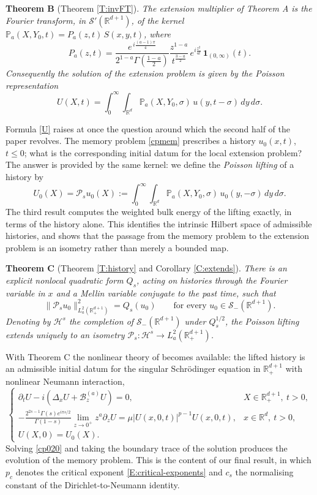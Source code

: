 \documentclass[11pt,letter]{amsart}
\def \RNu {\mathbb{R}^{d+1}}
\def \RN {\mathbb{R}_+^{d+1}}
\def \G{\Gamma}
\newcommand{\Ba}{\mathscr B_z^{(a)}}
\newcommand{\Rd}{\mathbb R^d}
\numberwithin{equation}{section}
\newcommand{\Sm}{\mathscr S_-(\RNu)}
\numberwithin{equation}{section}
\begin{document}
\medskip
\noindent\textbf{Theorem B} (Theorem \ref{T:invFT}).
\emph{The extension multiplier of Theorem A is the Fourier transform, in
$\mathscr S'(\RNu)$, of the kernel
$\mathbb P_a(X,Y_0,t)=P_a(z,t)\,S(x,y,t)$, where
\[
P_a(z,t)
=\frac{e^{\,i\frac{(a-1)\pi}{4}}}{2^{1-a}\G\!\left(\frac{1-a}{2}\right)}
\frac{z^{1-a}}{t^{\frac{3-a}{2}}}\,e^{i\frac{z^2}{4t}}\,\mathbf 1_{(0,\infty)}(t) .
\]
Consequently the solution of the extension problem is given by the Poisson
representation
\begin{equation}\label{U}
U(X,t)=\int_0^\infty\int_{\Rd}\mathbb P_a(X,Y_0,\sigma)\,u(y,t-\sigma)\,dy\,d\sigma .
\end{equation}}

\medskip
Formula \eqref{U} raises at once the question around which the second half of
the paper revolves. The memory problem \eqref{cpmem} prescribes a history $u_0(x,t)$,
$t\le0$; what is the corresponding initial datum for the local extension
problem? The answer is provided by the same kernel: we define the
\emph{Poisson lifting} of a history by
\begin{equation}\label{lift}
U_0(X)=\mathcal P_su_0(X)
:=\int_0^\infty\int_{\Rd}\mathbb P_a(X,Y_0,\sigma)\,u_0(y,-\sigma)\,dy\,d\sigma .
\end{equation}
The third result computes the weighted bulk energy of the lifting exactly, in
terms of the history alone. This identifies the intrinsic Hilbert space of
admissible histories, and shows that the passage from the memory problem to the
extension problem is an isometry rather than merely a bounded map.

\medskip
\noindent\textbf{Theorem C} (Theorem \ref{T:history} and Corollary \ref{C:extends}).
\emph{There is an explicit nonlocal quadratic form $Q_s$, acting on histories
through the Fourier variable in $x$ and a Mellin variable conjugate to the past
time, such that
\[
\|\mathcal P_su_0\|^2_{L^2_a(\RN)}=Q_s(u_0)
\qquad\text{for every } u_0\in\Sm .
\]
Denoting by $\mathcal H^s$ the completion of $\Sm$ under $Q_s^{1/2}$, the
Poisson lifting extends uniquely to an isometry
$\mathcal P_s:\mathcal H^s\to L^2_a(\RN)$.}

\medskip
With Theorem C the nonlinear theory of \cite{GS2} becomes available: the lifted
history is an admissible initial datum for the singular Schr\"odinger equation
in $\RN$ with nonlinear Neumann interaction,
\begin{equation}\label{cp020}
\begin{cases}
\partial_tU-i(\Delta_xU+\Ba U)=0,
&X\in\RN,\ t>0,
\\
\displaystyle
-\frac{2^{2s-1}\G(s)e^{i\pi s/2}}{\G(1-s)}\lim_{z\to0^+}z^a\partial_zU
=\mu |U(x,0,t)|^{p-1}U(x,0,t),
&x\in\Rd,\ t>0,
\\
U(X,0)=U_0(X).
\end{cases}
\end{equation}
Solving \eqref{cp020} and taking the boundary trace of the solution produces the
evolution of the memory problem. This is the content of our final result, in
which $p_c$ denotes the critical exponent \eqref{E:critical-exponents} and
$c_s$ the normalising constant of the Dirichlet-to-Neumann identity.
\end{document}
